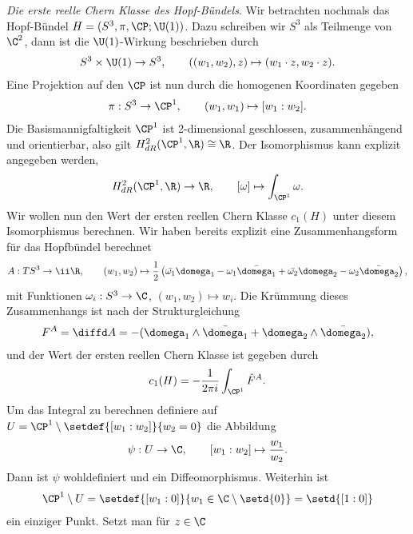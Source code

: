 \documentclass[%
	paper=a5,%
	fleqn,%
	DIV=18,%
	BCOR=0mm,
	fontsize=11pt,
	titlepage=false,%
	bibliography=totoc,
	DIV=18,%
	twoside=true,
	pdftitle=Riemannsche Geometrie,
	pdfauthor=Uwe Semmelmann,
	numbers=noendperiod]%
	{scrbook}
\begin{document}
\begin{ex}
\textit{Die erste reelle Chern Klasse des Hopf-Bündels}. Wir betrachten nochmals das Hopf-Bündel $H=(S^3,\pi,\CP;\U(1))$. 
Dazu schreiben wir $S^3$ als Teilmenge von $\C^2$, dann ist die $\U(1)$-Wirkung beschrieben durch
\begin{align*}
S^3\times \U(1)\to S^3,\qquad ((w_1,w_2),z)\mapsto (w_1 \cdot z,w_2\cdot z).
\end{align*}
Eine Projektion auf den $\CP$ ist nun durch die homogenen Koordinaten gegeben
\begin{align*}
\pi: S^3\to \CP^1,\qquad (w_1,w_1)\mapsto [w_1:w_2].
\end{align*}
Die Basismannigfaltigkeit $\CP^1$ ist 2-dimensional geschlossen,
zusammenhängend und orientierbar, also gilt $H_{dR}^2(\CP^1,\R)\cong\R$. Der
Isomorphismus kann explizit angegeben werden,
\begin{align*}
H_{dR}^2(\CP^1,\R)\to\R,\qquad [\omega]\mapsto \int_{\CP^1}\omega.
\end{align*}
Wir wollen nun den Wert der ersten reellen Chern Klasse $c_1(H)$ unter diesem
Isomorphismus berechnen. Wir haben bereits explizit eine Zusammenhangsform für
das Hopfbündel berechnet
\begin{align*}
A : TS^3\to \ii\R,\qquad (w_1,w_2) \mapsto 
\frac{1}{2}\left(\bar{\omega_1}\domega_1 - \omega_1\bar{\domega_1} +
\bar{\omega_2}\domega_2 - \omega_2\bar{\domega_2} \right),
\end{align*}
mit Funktionen $\omega_i : S^3\to \C$, $(w_1,w_2)\mapsto w_i$.
Die Krümmung dieses Zusammenhangs ist nach der Strukturgleichung
\begin{align*}
F^A = \diffd A = -(\domega_1\wedge \bar{\domega_1} + \domega_2\wedge
\bar{\domega_2}),
\end{align*}
und der Wert der ersten reellen Chern Klasse ist gegeben durch
\begin{align*}
c_1(H) = -\frac{1}{2\pi i} \int_{\CP^1} \hat{F}^A.
\end{align*}
Um das Integral zu berechnen definiere auf
$U=\CP^1\setminus\setdef{[w_1:w_2]}{w_2=0}$ die Abbildung
\begin{align*}
\psi: U\to \C,\qquad [w_1:w_2]\mapsto \frac{w_1}{w_2}.
\end{align*}
Dann ist $\psi$ wohldefiniert und ein Diffeomorphismus. Weiterhin
ist
\begin{align*}
\CP^1\setminus U = \setdef{[w_1:0]}{w_1\in\C\setminus\setd{0}} = \setd{[1:0]}
\end{align*}
ein einziger Punkt. Setzt man für $z\in \C$

\end{ex}
\end{document}
